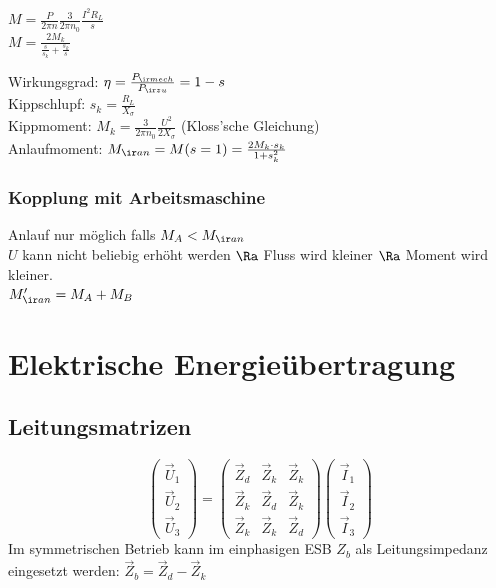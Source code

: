 \documentclass[european]{latex4ei_sheet}
\begin{document}
		 $M = \frac{P}{2\pi n} \frac{3}{2 \pi n_0} \frac{I^2 R_L}{s}$ \\

		 $M = \frac{2 M_k}{\frac{s}{s_k} + \frac{s_k}{s}}$


		
		
		Wirkungsgrad: $\eta = \frac{P_{\ir mech}}{P_{\ir zu}} = 1 - s$ \\
		Kippschlupf: $s_k = \frac{R_L}{X_\sigma}$ \\
		Kippmoment: $M_k = \frac{3}{2 \pi n_0} \frac{U^2}{2 X_\sigma}$ (Kloss'sche Gleichung)\\
		Anlaufmoment: $M_{\ir an} = M(s=1) = \frac{2M_k\cdot s_k}{1+s_k^2}$\\
		
		\subsubsection{Kopplung mit Arbeitsmaschine}
		Anlauf nur möglich falls $M_A < M_{\ir an}$\\
		$U$ kann nicht beliebig erhöht werden $\Ra$ Fluss wird kleiner $\Ra$ Moment wird kleiner.\\
		
		$M'_{\ir an} = M_A+M_B$
		
		
		
	\section{Elektrische Energieübertragung}
	
		\subsection{Leitungsmatrizen}
		
		
		\[\begin{pmatrix} \vec U_1 \\ \vec U_2 \\ \vec U_3 \end{pmatrix} = \begin{pmatrix} \vec Z_d & \vec Z_k & \vec Z_k \\ \vec Z_k & \vec Z_d & \vec Z_k \\ \vec Z_k & \vec Z_k & \vec Z_d \end{pmatrix} \begin{pmatrix} \vec I_1 \\ \vec I_2 \\ \vec I_3 \end{pmatrix}\]
		Im symmetrischen Betrieb kann im einphasigen ESB $Z_b$ als Leitungsimpedanz eingesetzt werden: $\vec Z_b = \vec Z_d - \vec Z_k$
		
\end{document}
